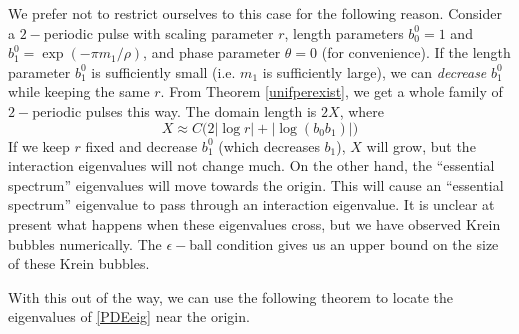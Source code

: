 \documentclass[thesis.tex]{subfiles}
\begin{document}
We prefer not to restrict ourselves to this case for the following reason. Consider a $2-$periodic pulse with scaling parameter $r$, length parameters $b_0^0 = 1$ and $b_1^0 = \exp(-\pi m_1/\rho)$, and phase parameter $\theta = 0$ (for convenience). If the length parameter $b_1^0$ is sufficiently small (i.e. $m_1$ is sufficiently large), we can \emph{decrease} $b_1^0$ while keeping the same $r$. From Theorem \ref{unifperexist}, we get a whole family of $2-$periodic pulses this way. The domain length is $2X$, where
\[
X \approx C \Big( 2 |\log r| + |\log(b_0 b_1)| \Big)
\]
If we keep $r$ fixed and decrease $b_1^0$ (which decreases $b_1$), $X$ will grow, but the interaction eigenvalues will not change much. On the other hand, the ``essential spectrum'' eigenvalues will move towards the origin. This will cause an ``essential spectrum'' eigenvalue to pass through an interaction eigenvalue. It is unclear at present what happens when these eigenvalues cross, but we have observed Krein bubbles numerically. The $\epsilon-$ball condition gives us an upper bound on the size of these Krein bubbles.

With this out of the way, we can use the following theorem to locate the eigenvalues of \eqref{PDEeig} near the origin.

\end{document}

